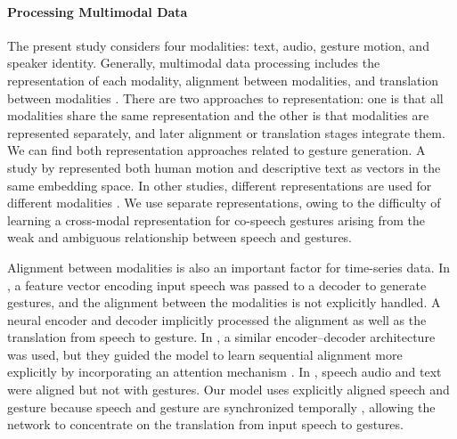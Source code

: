 \documentclass[acmtog]{acmart}
\begin{document}
\paragraph{Processing Multimodal Data}
The present study considers four modalities: text, audio, gesture motion, and speaker identity. Generally, multimodal data processing includes the representation of each modality, alignment between modalities, and translation between modalities \cite{baltruvsaitis2018multimodal}. There are two approaches to representation: one is that all modalities share the same representation and the other is that modalities are represented separately, and later alignment or translation stages integrate them. We can find both representation approaches related to gesture generation. A study by \cite{ahuja2019language2pose} represented both human motion and descriptive text as vectors in the same embedding space. In other studies, different representations are used for different modalities \cite{roddy2018multimodal, sadoughi2019speech}. We use separate representations, owing to the difficulty of learning a cross-modal representation for co-speech gestures arising from the weak and ambiguous relationship between speech and gestures.

Alignment between modalities is also an important factor for time-series data. In \cite{ginosar2019gestures}, a feature vector encoding input speech was passed to a decoder to generate gestures, and the alignment between the modalities is not explicitly handled. A neural encoder and decoder implicitly processed the alignment as well as the translation from speech to gesture. In \cite{yoon2019robots}, a similar encoder--decoder architecture was used, but they guided the model to learn sequential alignment more explicitly by incorporating an attention mechanism \cite{bahdanau2014neural}. In \cite{kucherenko2020gesticulator}, speech audio and text were aligned but not with gestures. Our model uses explicitly aligned speech and gesture because speech and gesture are synchronized temporally \cite{chu2014synchronization}, allowing the network to concentrate on the translation from input speech to gestures.
\end{document}
